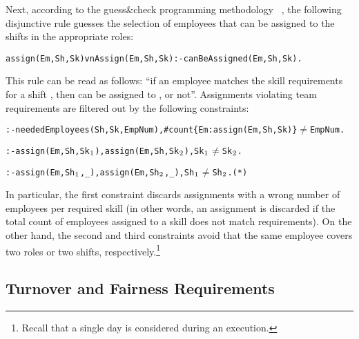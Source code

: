 \documentclass{tlp}
\begin{document}
Next, according to the guess\&check programming methodology
~\cite{eite-etal-2000c,leon-etal-2002-dlv}, the following disjunctive rule 
guesses the selection of employees that can be assigned to the shifts in the appropriate roles:
\begin{alltt}\small
 assign(Em,Sh,Sk) v nAssign(Em,Sh,Sk) :- canBeAssigned(Em,Sh,Sk).
\end{alltt}\normalsize
This rule can be read as follows: ``if an employee  matches the skill requirements for a shift , then
 can be assigned to , or not''.
Assignments violating team requirements are filtered out
by the following constraints:
\begin{alltt}\small
 :- neededEmployees(Sh,Sk,EmpNum), #count\{Em: assign(Em,Sh,Sk)\} \(\neq\) EmpNum.

 :- assign(Em,Sh,Sk\(\sb{1}\)), assign(Em,Sh,Sk\(\sb{2}\)), Sk\(\sb{1}\) \(\neq\) Sk\(\sb{2}\).

 :- assign(Em,Sh\(\sb{1}\),_), assign(Em,Sh\(\sb{2}\),_), Sh\(\sb{1}\) \(\neq\) Sh\(\sb{2}\). \hfill (*)
\end{alltt}\normalsize
In particular, the first constraint discards assignments with a wrong number of employees per required skill
(in other words, an assignment is discarded if the total count of employees assigned to a skill does not match requirements).
On the other hand, the second and third constraints avoid
that the same employee covers two roles or two shifts, respectively.\footnote{Recall that a single day is considered during an execution.}


\subsection{Turnover and Fairness Requirements}\label{subsec:turnover}
\end{document}
